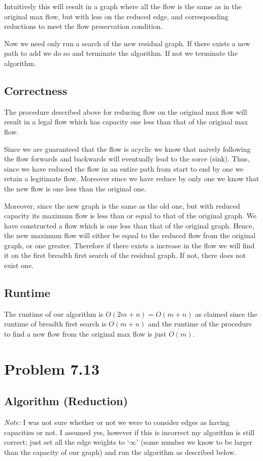 \documentclass{article}
\begin{document}
Intuitively this will result in a graph where all the flow is the same as in the original max flow, but with less on the reduced edge, and corresponding reductions to meet the flow preservation condition.

Now we need only run a search of the new residual graph. If there exists a new path to add we do so and terminate the algorithm. If not we terminate the algorithm.

\subsection{Correctness}
The procedure described above for reducing flow on the original max flow will result in a legal flow which has capacity one less than that of the original max flow. 

Since we are guaranteed that the flow is acyclic we know that naively following the flow forwards and backwards will eventually lead to the sorce (sink). Thus, since we have reduced the flow in an entire path from start to end by one we retain a legitimate flow. Moreover since we have reduce by only one we know that the new flow is one less than the original one.


Moreover, since the new graph is the same as the old one, but with reduced capacity its maximum flow is less than or equal to that of the original graph. We have constructed a flow which is one less than that of the original graph. Hence, the new maximum flow will either be equal to the reduced flow from the original graph, or one greater. Therefore if there exists a increase in the flow we will find it on the first breadth first search of the residual graph. If not, there does not exist one.

\subsection{Runtime}

The runtime of our algorithm is $O(2m+n)=O(m+n)$ as claimed since the runtime of breadth first search is $O(m+n)$ and the runtime of the procedure to find a new flow from the original max flow is just $O(m)$.



\section{Problem 7.13}
\subsection{Algorithm (Reduction)}
\emph{Note: }I was not sure whether or not we were to consider edges as having capacities or not. I assumed yes, however if this is incorrect my algorithm is still correct; just set all the edge weights to `$\infty$' (some number we know to be larger than the capacity of our graph) and run the algorithm as described below.
\end{document}
